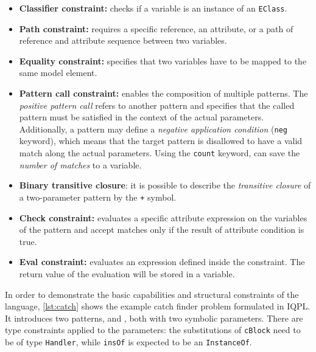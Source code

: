 \begin{itemize}
	\item \textbf{Classifier constraint:} checks if a variable is an instance of an \texttt{EClass}.
	\item \textbf{Path constraint:} requires a specific reference, an attribute, or a path of reference and attribute sequence between two variables.
	\item \textbf{Equality constraint:} specifies that two variables have to be mapped to the same model element.
	\item \textbf{Pattern call constraint:} enables the composition of multiple patterns. The \emph{positive pattern call} refers to another pattern and specifies that the called pattern must be satisfied in the context of the actual parameters. Additionally, a pattern may define a \emph{negative application condition} (\texttt{neg} keyword), which means that the target pattern is disallowed to have a valid match along the actual parameters. Using the \texttt{count} keyword, \eiq can save the \emph{number of matches} to a variable. 
	\item \textbf{Binary transitive closure}: it is possible to describe the \emph{transitive closure} of a two-parameter pattern by the \texttt{+} symbol.
	\item \textbf{Check constraint:} evaluates a specific attribute expression on the variables of the pattern and accept matches only if the result of attribute condition is true.
	\item \textbf{Eval constraint:} evaluates an expression defined inside the constraint. The return value of the evaluation will be stored in a variable.
\end{itemize}



In order to demonstrate the basic capabilities and structural constraints of the language, \autoref{lst:catch} shows the example catch finder problem formulated in IQPL. It introduces two patterns, \catchproblem and \handlervar, both with two symbolic parameters. There are type constraints applied to the parameters: the substitutions of \texttt{cBlock} need to be of type \texttt{Handler}, while \texttt{insOf} is expected to be an \texttt{InstanceOf}. 

\begin{figure}[!htbp]
\end{figure}

